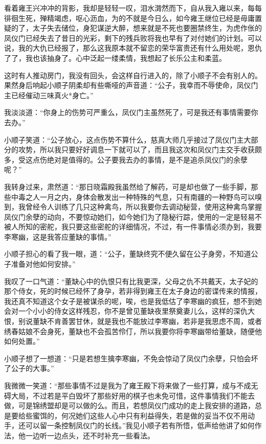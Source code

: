 看着雍王兴冲冲的背影，我却是轻轻一叹，泪水潸然而下，自从我入雍以来，每每徘徊生死，殚精竭虑，呕心沥血，为的不就是今日么，如今雍王继位已经是毋庸置疑的了，太子失去储位，身犯谋逆大醉，想来就是不死也要圈禁终生，为虎作伥的凤仪门已经失去了昔日的光彩，剩下的残兵败将我也早有了对付她们的计划。可以说，我的大仇已经报了，那么这我原本就不留恋的荣华富贵还有什么用处呢，恩仇了了，我也该抽身了。心中泛起一缕柔情，我想起了长乐公主和柔蓝。

这时有人推动房门，我没有回头，会这样自行进入的，除了小顺子不会有别人的。果然身后响起小顺子阴柔却有些嘶哑的声音道：“公子，我幸而不辱使命，凤仪门主已经催动三味真火*身亡。”

我淡淡道：“你身上的伤势可严重么，凤仪门主虽然死了，可是我还有事情需要你去办。”

小顺子笑道：“公子放心，这点伤势不算什么，慈真大师几乎接过了凤仪门主大部分的攻势，所以我只要好好调息一下就可以了，而且我这次和凤仪门主交手收获颇多，受这点伤绝对是值得的。公子要我去办的事情，是不是追杀凤仪门的余孽呢？”

我转身过来，肃然道：“那日晓霜殿我虽然给了解药，可是却也做了一些手脚，那些中毒之人一月之内，身体会散发出一种特殊的气息，只有南疆的一种野鸟可以嗅到，我曾经令人训练了几只这种禽鸟，所以我要你去调动秘营，使用这种禽鸟掌握凤仪门余孽的动向，不要惊动她们，如今她们为了隐秘行踪，使用的一定是轻易不被人所知的密舵，我只要这些密舵的详细情况，不过，有一件事情必须办到，我要李寒幽，这是我答应董缺的事情。”

小顺子担心的看了我一眼，道：“公子，董缺终究不便久留在公子身旁，不知道公子准备对他如何安排。”

我叹了一口气道：“董缺心中的仇恨只有比我更深，父母之仇不共戴天，太子妃的那个侍女，死的时候已经怀了身孕，若非得到雍王在太子身边的密谍传来的情报，我还真不知道这个女子是被谋杀的呢，唉，也是我低估了李寒幽的疯狂，想不到她会对一个小小的侍女这样残忍，你不是曾见董缺夜里祭奠妻儿么，这样的深仇大恨，别说董缺不肯善罢甘休，就是我也不能放过李寒幽，若非是我思虑不周，或者绣春姑娘不会身死，董缺也不会孤苦伶仃，所以我要你将李寒幽带给董缺，随便他如何处置。”

小顺子想了一想道：“只是若想生擒李寒幽，不免会惊动了凤仪门余孽，只怕会坏了公子的大事。”

我微微一笑道：“那些事情不过是我为了雍王殿下将来做了一些打算，成与不成无碍大局，不过若是平白毁坏了那些好用的棋子也未免可惜，这件事情我们不能去做，可是锦绣盟却是可以做的么。而且，若想凤仪门成功的走上我安排的道路，总是要给些蜜饵的，何况她们这些人心中只有利益得失，若是做的妥当不仅不用动手，还可以留一条控制凤仪门的长线。”我见小顺子若有所悟，低声给他讲了如何作法，他一边听一边点头，还不时补充一些看法。

